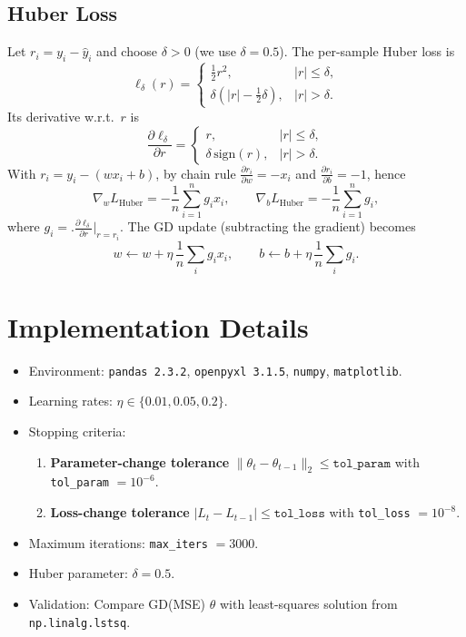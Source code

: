\documentclass[11pt]{article}
\begin{document}
\subsection{Huber Loss}
Let $r_i=y_i-\hat y_i$ and choose $\delta>0$ (we use $\delta=0.5$). The per-sample Huber loss is
\[
\ell_\delta(r) =
\begin{cases}
\frac{1}{2}r^2,& |r|\le\delta,\\[3pt]
\delta\!\left(|r|-\frac{1}{2}\delta\right),& |r|>\delta.
\end{cases}
\]
Its derivative w.r.t.\ $r$ is
\[
\frac{\partial \ell_\delta}{\partial r}=
\begin{cases}
r,& |r|\le\delta,\\
\delta\,\mathrm{sign}(r),& |r|>\delta.
\end{cases}
\]
With $r_i=y_i-(w x_i + b)$, by chain rule $\frac{\partial r_i}{\partial w}=-x_i$ and $\frac{\partial r_i}{\partial b}=-1$, hence
\[
\nabla_w L_{\mathrm{Huber}}=-\frac{1}{n}\sum_{i=1}^n g_i x_i,\qquad
\nabla_b L_{\mathrm{Huber}}=-\frac{1}{n}\sum_{i=1}^n g_i,
\]
where $g_i=\bigl.\frac{\partial \ell_\delta}{\partial r}\bigr|_{r=r_i}$. The GD update (subtracting the gradient) becomes
\[
w \leftarrow w + \eta \,\frac{1}{n}\sum_i g_i x_i,\qquad
b \leftarrow b + \eta \,\frac{1}{n}\sum_i g_i.
\]

\section{Implementation Details}
\begin{itemize}[leftmargin=1.5em]
  \item Environment: \texttt{pandas 2.3.2}, \texttt{openpyxl 3.1.5}, \texttt{numpy}, \texttt{matplotlib}.
  \item Learning rates: $\eta\in\{0.01, 0.05, 0.2\}$.
  \item Stopping criteria:
  \begin{enumerate}[nosep]
    \item \textbf{Parameter-change tolerance} $\|\theta_{t}-\theta_{t-1}\|_2 \le \texttt{tol\_param}$ with \texttt{tol\_param} $=10^{-6}$.
    \item \textbf{Loss-change tolerance} $|L_t-L_{t-1}| \le \texttt{tol\_loss}$ with \texttt{tol\_loss} $=10^{-8}$.
  \end{enumerate}
  \item Maximum iterations: \texttt{max\_iters} $=3000$.
  \item Huber parameter: $\delta=0.5$.
  \item Validation: Compare GD(MSE) $\theta$ with least-squares solution from \texttt{np.linalg.lstsq}.
\end{itemize}
\end{document}
